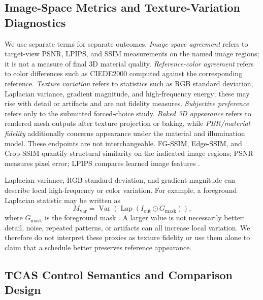 \documentclass[times,twocolumn,final]{elsarticle}
\providecommand{\DIFadd}[1]{{\protect\color{blue} \sf #1}} %
\providecommand{\DIFaddbegin}{} %
\providecommand{\DIFaddend}{} %
\begin{document}
  \DIFaddbegin \subsection{Image-Space Metrics and Texture-Variation Diagnostics}
\DIFaddend \label{subsec:metrics}

  \DIFaddbegin \DIFadd{We use separate terms for separate outcomes. \emph{Image-space agreement} refers to target-view PSNR, LPIPS, and SSIM measurements on the named image regions; it is not a measure of final 3D material quality. \emph{Reference-color agreement} refers to color differences such as CIEDE2000 computed against the corresponding reference. \emph{Texture variation} refers to statistics such as RGB standard deviation, Laplacian variance, gradient magnitude, and high-frequency energy; these may rise with detail or artifacts and are not fidelity measures. \emph{Subjective preference} refers only to the submitted forced-choice study. \emph{Baked 3D appearance} refers to rendered mesh outputs after texture projection or baking, while \emph{PBR/material fidelity} additionally concerns appearance under the material and illumination model. These endpoints are not interchangeable. }\DIFaddend FG-SSIM, Edge-SSIM, and Crop-SSIM   \DIFaddbegin \DIFadd{quantify structural similarity on the indicated image regions; PSNR measures pixel error; LPIPS compares learned image features \cite{wang2004ssim,zhang2018lpips}.
}

\DIFaddend Laplacian variance, RGB standard deviation, and gradient magnitude   \DIFaddbegin \DIFadd{can describe local }\DIFaddend high-frequency  
 \DIFaddbegin \DIFadd{or color variation. For example, a foreground Laplacian statistic may be written as
}\begin{equation}
M_{\mathrm{var}}=\operatorname{Var}\!\left(\operatorname{Lap}(I_{\mathrm{out}}\odot G_{\mathrm{mask}})\right),
\end{equation}\DIFaddend 
where   \DIFaddbegin \DIFadd{$G_{\mathrm{mask}}$ is }\DIFaddend the foreground mask  . A larger   \DIFaddbegin \DIFadd{value is not necessarily better: detail, noise, repeated patterns, or artifacts can all increase local variation. We therefore do not interpret these proxies as texture fidelity or use them alone to claim that a schedule better preserves reference appearance}\DIFaddend .

  \DIFaddbegin \subsection{TCAS Control Semantics and Comparison Design}
\DIFaddend \label{subsec:tcas}
\end{document}
